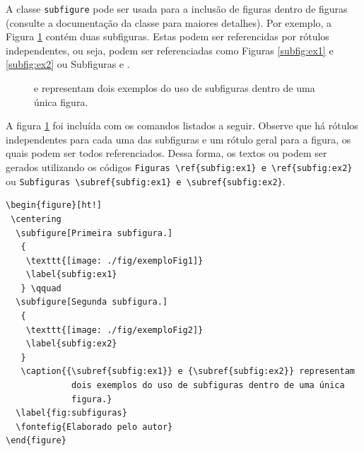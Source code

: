 A classe \verb|subfigure| pode ser usada para a inclusão de figuras dentro de figuras (consulte a documentação da classe para maiores detalhes). Por exemplo, a Figura \ref{fig:subfiguras} contém duas subfiguras. Estas podem ser referencidas por rótulos independentes, ou seja, podem ser referenciadas como Figuras \ref{subfig:ex1} e \ref{subfig:ex2} ou Subfiguras  e .
\begin{figure}[ht!]
 \centering
   \qquad
   \caption{{} e {} representam dois exemplos do uso de subfiguras dentro de uma única figura.}
  \label{fig:subfiguras}
\end{figure}

A figura \ref{fig:subfiguras} foi incluída com os comandos listados a seguir. Observe que há rótulos independentes para cada uma das subfiguras e um rótulo geral para a figura, os quais podem ser todos referenciados. Dessa forma, os textos  ou  podem ser gerados utilizando os códigos \verb|Figuras \ref{subfig:ex1} e \ref{subfig:ex2}| ou \verb|Subfiguras \subref{subfig:ex1} e \subref{subfig:ex2}|.

\begin{verbatim}
\begin{figure}[ht!]
 \centering
  \subfigure[Primeira subfigura.]
   {
    \texttt{[image: ./fig/exemploFig1]}
    \label{subfig:ex1}
   } \qquad
  \subfigure[Segunda subfigura.]
   {
    \texttt{[image: ./fig/exemploFig2]}
    \label{subfig:ex2}
   }
   \caption{{\subref{subfig:ex1}} e {\subref{subfig:ex2}} representam
             dois exemplos do uso de subfiguras dentro de uma única
             figura.}
  \label{fig:subfiguras}
  \fontefig{Elaborado pelo autor}
\end{figure}
\end{verbatim}

